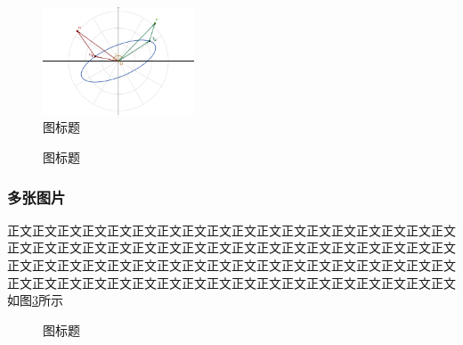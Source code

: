 \documentclass[a4paper]{article}
\begin{document}
\begin{figure}[!h]
	\centering
	\vspace{0cm}
	\includegraphics[width=0.4\textwidth,trim=0 0 0 0,clip]{figures/fig6.pdf}%
	\vspace{0cm}
	\caption{图标题}
	\label{fig:pdf}
\end{figure}

\begin{figure}[!h]
	\centering
	\vspace{0cm}
	
	\vspace{0cm}
	\caption{图标题}
	\label{fig:svg}
\end{figure}



\subsubsection{多张图片}
正文正文正文正文正文正文正文正文正文正文正文正文正文正文正文正文正文正文正文正文正文正文正文正文正文正文正文正文正文正文正文正文正文正文正文正文正文正文正文正文正文正文正文正文正文正文正文正文正文正文正文正文正文\cite{wiki,EM}正文正文正文正文正文正文正文正文正文正文正文正文正文正文正文正文正文正文正文如图\ref{fig:multi}所示

\begin{figure}[!h]
	\centering
	\caption{图标题}
	\label{fig:multi}
\end{figure}
\end{document}
